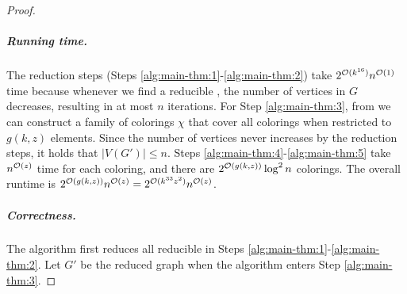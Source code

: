 \begin{proof}

  \subparagraph*{Running time.}
  The reduction steps (Steps \ref{alg:main-thm:1}-\ref{alg:main-thm:2}) take $2^{\mathcal{O}(k^{16})} n^{\mathcal{O}(1)}$ time
  because whenever we find a reducible \occ, the number of vertices in $G$ decreases, resulting in at most $n$ iterations.
  For Step \ref{alg:main-thm:3}, from  we can construct a family of colorings $\chi$
  that cover all colorings when restricted to $g(k,z)$ elements.
  Since the number of vertices never increases by the reduction steps, it holds that $|V(G')| \leq n$.
  Steps \ref{alg:main-thm:4}-\ref{alg:main-thm:5} take $n^{\mathcal{O}(z)}$ time for each coloring,
  and there are $2^{\mathcal{O}(g(k,z))} \log^2 n$ colorings.
  The overall runtime is $2^{\mathcal{O}(g(k,z))} n^{\mathcal{O}(z)} = 2^{\mathcal{O}(k^{33} z^2)} n^{\mathcal{O}(z)}$.

  \subparagraph*{Correctness.}
  The algorithm first reduces all reducible \occs in Steps \ref{alg:main-thm:1}-\ref{alg:main-thm:2}.
  Let $G'$ be the reduced graph when the algorithm enters Step \ref{alg:main-thm:3}.
	

\end{proof}
